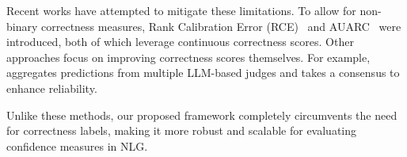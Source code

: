 Recent works have attempted to mitigate these limitations. 
To allow for non-binary correctness measures, Rank Calibration Error (RCE)~\cite{RCEhuang2024} and AUARC~\cite{auarc,lin2024generating} were introduced, both of which leverage continuous correctness scores. 
Other approaches focus on improving correctness scores themselves. 
For example, \citet{CSL} aggregates predictions from multiple LLM-based judges and takes a consensus to enhance reliability.

Unlike these methods, our proposed framework completely circumvents the need for correctness labels, making it more robust and scalable for evaluating confidence measures in NLG. 


